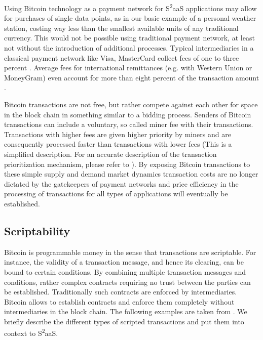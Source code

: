 Using Bitcoin technology as a payment network for S\textsuperscript{2}aaS applications may allow for purchases of single data points, as in our basic example of a personal weather station, costing way less than the smallest available units of any traditional currency. This would not be possible using traditional payment network, at least not without the introduction of additional processes. Typical intermediaries in a classical payment network like Visa, MasterCard collect fees of one to three percent \parencite{chakravorti2003theory}. Average fees for international remittances (e.g. with Western Union or MoneyGram) even account for more than eight percent of the transaction amount \parencite{remittances}.

Bitcoin transactions are not free, but rather compete against each other for space in the block chain in something similar to a bidding process. Senders of Bitcoin transactions can include a voluntary, so called miner fee with their transactions. Transactions with higher fees are given higher priority by miners and are consequently processed faster than transactions with lower fees (This is a simplified description. For an accurate description of the transaction prioritization mechanism, please refer to \parencite{bitcoinwiki, nakamoto2008bitcoin}). By exposing Bitcoin transactions to these simple supply and demand market dynamics transaction costs are no longer dictated by the gatekeepers of payment networks and price efficiency in the processing of transactions for all types of applications will eventually be established.

\subsection{Scriptability}
\label{subsec:script}

Bitcoin is programmable money in the sense that transactions are scriptable. For instance, the validity of a transaction message, and hence its clearing, can be bound to certain conditions. By combining multiple transaction messages and conditions, rather complex contracts requiring no trust between the parties can be established. Traditionally such contracts are enforced by intermediaries. Bitcoin allows to establish contracts and enforce them completely without intermediaries in the block chain. The following examples are taken from \cite{smartcontr}. We briefly describe the different types of scripted transactions and put them into context to S\textsuperscript{2}aaS.

